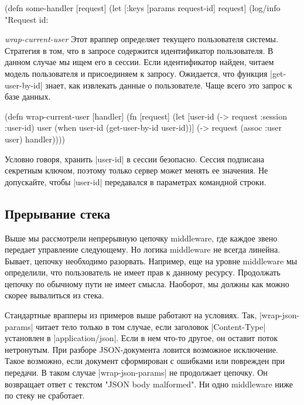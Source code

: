\begin{code}
(defn some-handler
  [request]
  (let [{:keys [params request-id]} request]
    (log/info "Request id: %
\end{code}

\emph{wrap-current-user} Этот враппер определяет текущего пользователя
системы. Стратегия в том, что в запросе содержится идентификатор пользователя. В
данном случае мы ищем его в сессии. Если идентификатор найден, читаем модель
пользователя и присоединяем к запросу. Ожидается, что функция
\spverb|get-user-by-id| знает, как извлекать данные о пользователе. Чаще всего
это запрос к базе данных.

\begin{code}
(defn wrap-current-user
  [handler]
  (fn [request]
    (let [user-id (-> request :session :user-id)
          user (when user-id
                 (get-user-by-id user-id))]
      (-> request
          (assoc :user user)
          handler))))
\end{code}

Условно говоря, хранить \spverb|user-id| в сессии безопасно. Сессия подписана секретным
ключом, поэтому только сервер может менять ее значения. Не допускайте, чтобы
\spverb|user-id| передавался в параметрах командной строки.

\subsection{Прерывание стека}

Выше мы рассмотрели непрерывную цепочку middleware, где каждое звено передает
управление следующему. Но логика middleware не всегда линейна. Бывает, цепочку
необходимо разорвать. Например, еще на уровне middleware мы определили, что
пользователь не имеет прав к данному ресурсу. Продолжать цепочку по обычному
пути не имеет смысла. Наоборот, мы должны как можно скорее вывалиться из стека.

Стандартные врапперы из примеров выше работают на условиях. Так,
\spverb|wrap-json-params| читает тело только в том случае, если заголовок
\spverb|Content-Type| установлен в \spverb|application/json|. Если в нем что-то другое, он
оставит поток нетронутым. При разборе JSON-документа ловится возможное
исключение. Такое возможно, если документ сформирован с ошибками или поврежден
при передачи. В таком случае \spverb|wrap-json-params| не продолжает цепочку. Он
возвращает ответ с текстом "JSON body malformed". Ни одно middleware ниже по
стеку не сработает.


